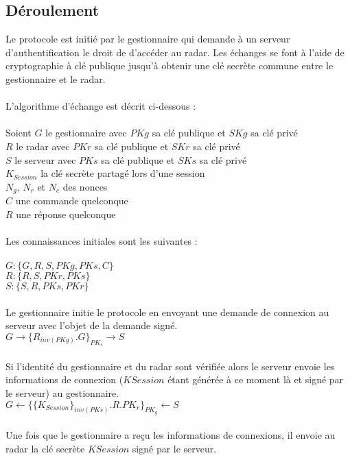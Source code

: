 \documentclass[]{scrartcl}
\begin{document}
\subsection{Déroulement}

Le protocole est initié par le gestionnaire qui demande à un serveur d'authentification le droit de d'accéder au radar. Les échanges se font à l'aide de cryptographie à clé publique jusqu'à obtenir une clé secrète commune entre le gestionnaire et le radar. 
\\
\\
L'algorithme d'échange est décrit ci-dessous : 
\\
\\
Soient 
$G$ le gestionnaire avec $PKg$ sa clé publique et  $SKg$ sa clé privé
\\
$R$ le radar avec $PKr$ sa clé publique et  $SKr$ sa clé privé
\\
$S$ le serveur avec $PKs$ sa clé publique et  $SKs$ sa clé privé
\\
$K_{Session}$ la clé secrète partagé lors d'une session
\\
$N_{g}$, $N_{r}$ et $N_{c}$ des nonces
\\
$C$ une commande quelconque
\\
$R$ une réponse quelconque
\\
\\
Les connaissances initiales sont les suivantes :
\\
\\
$G : \{G, R, S, PKg, PKs, C\}$
\\
$R : \{R, S, PKr, PKs\}$
\\
$S : \{S, R, PKs, PKr\}$
\\
\\
Le gestionnaire initie le protocole en envoyant une demande de connexion au serveur avec l'objet de la demande signé.
\\
$G \rightarrow \{{R}_{inv(PKg)}.G\}_{PK_{s}} \longrightarrow S$
\\
\\
Si l'identité du gestionnaire et du radar sont vérifiée alors le serveur envoie les informations de connexion ($KSession$ étant générée à ce moment là et signé par le serveur) au gestionnaire.
\\
$G \longleftarrow \{\{K_{Session}\}_{inv(PKs)}.R.PK_{r}\}_{PK_{g}} \leftarrow S$
\\
\\
Une fois que le gestionnaire a reçu les informations de connexions, il envoie au radar la clé secrète $KSession$ signé par le serveur.
\end{document}
